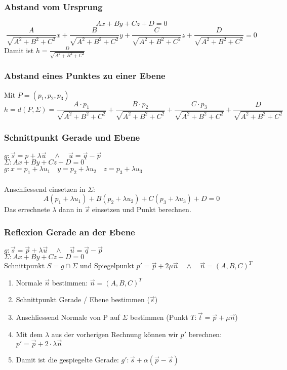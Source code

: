 \documentclass{report}
\begin{document}
\subsubsection{Abstand vom Ursprung}
\begin{equation}Ax + By + Cz + D = 0\end{equation}
\begin{equation}\frac{A}{\sqrt{A^2+B^2+C^2}}x+\frac{B}{\sqrt{A^2+B^2+C^2}}y + \frac{C}{\sqrt{A^2+B^2+C^2}}z + \frac{D}{\sqrt{A^2+B^2+C^2}} = 0\end{equation}
Damit ist $h = \frac{D}{\sqrt{A^2+B^2+C^2}}$
\subsubsection{Abstand eines Punktes zu einer Ebene}
Mit $P = (p_1, p_2, p_3)$
\begin{equation}h = d(P, \Sigma) = \frac{A \cdot p_1}{\sqrt{A^2+B^2+C^2}} + \frac{B \cdot p_2}{\sqrt{A^2+B^2+C^2}} + \frac{C \cdot p_3}{\sqrt{A^2+B^2+C^2}} + \frac{D}{\sqrt{A^2+B^2+C^2}}\end{equation}
\subsubsection{Schnittpunkt Gerade und Ebene}
$g: \vec{s} = p + \lambda \vec{u} \quad \land \quad \vec{u} = \vec{q} - \vec{p}$\\
$\Sigma: Ax+By+Cz+D=0$\\
$g: x = p_1+\lambda u_1 \quad y=p_2+\lambda u_2 \quad z = p_3 + \lambda u_3$\\\\
Anschliessend einsetzen in $\Sigma$:
\begin{equation}A(p_1+\lambda u_1) + B(p_2+\lambda u_2) + C(p_3+\lambda u_3) + D = 0\end{equation}
Das errechnete $\lambda$ dann in $\vec{s}$ einsetzen und Punkt berechnen.
\subsubsection{Reflexion Gerade an der Ebene}
$g: \vec{s} = \vec{p} + \lambda \vec{u} \quad \land \quad \vec{u} = \vec{q} - \vec{p}$\\
$\Sigma: Ax + By + Cz + D = 0$\\
Schnittpunkt $S = g \cap \Sigma$ und Spiegelpunkt $p' = \vec{p} + 2 \mu \vec{n} \quad \land \quad \vec{n} = (A,B,C)^T$
\begin{enumerate}
\item Normale $\vec{n}$ bestimmen: $\vec{n} = (A,B,C)^T$
\item Schnittpunkt Gerade / Ebene bestimmen ($\vec{s}$)
\item Anschliessend Normale von P auf $\Sigma$ bestimmen (Punkt $T: \vec{t} = \vec{p}+ \mu \vec{n}$)
\item Mit dem $\lambda$ aus der vorherigen Rechnung können wir $p'$ berechnen: $p' = \vec{p} + 2 \cdot \lambda \vec{n}$
\item Damit ist die gespiegelte Gerade: $g': \vec{s} + \alpha (\vec{p} - \vec{s})$
\end{enumerate}
\end{document}
